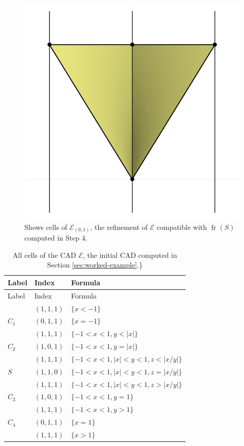 \documentclass[
]{book}
\theoremstyle{definition}
\theoremstyle{definition}
\theoremstyle{definition}
\theoremstyle{definition}
\theoremstyle{remark}
\begin{document}
\begin{figure}

{\centering \includegraphics[width=0.6\linewidth]{gnuplot/r3-refined} 

}

\caption{Shows cells of $\mathcal{E}_{(0,1)}$, the refinement of $\mathcal{E}$ compatible with ${\operatorname{fr} \left( S \right)}$ computed in Step 4.}\label{fig:final-cad}
\end{figure}

\begin{longtable}[]{@{}lll@{}}
\caption{\label{tab:cells-of-e} All cells of the CAD \(\mathcal{E}\), the initial CAD computed in Section \ref{sec:worked-example}.\}}\tabularnewline
\toprule
Label & Index & Formula\tabularnewline
\midrule
\endfirsthead
\toprule
Label & Index & Formula\tabularnewline
\midrule
\endhead
& \((1,1,1)\) & \(\{ x < -1 \}\)\tabularnewline
\(C_1\) & \((0,1,1)\) & \(\{ x = -1 \}\)\tabularnewline
& \((1,1,1)\) & \(\{ -1 < x < 1, y < \vert x \vert \}\)\tabularnewline
\(C_2\) & \((1,0,1)\) & \(\{ -1 < x < 1, y = \vert x \vert \}\)\tabularnewline
& \((1,1,1)\) & \(\{ -1 < x < 1, \vert x \vert < y < 1, z < \vert x/y \vert \}\)\tabularnewline
\(S\) & \((1,1,0)\) & \(\{ -1 < x < 1, \vert x \vert < y < 1, z = \vert x/y \vert \}\)\tabularnewline
& \((1,1,1)\) & \(\{ -1 < x < 1, \vert x \vert < y < 1, z > \vert x/y \vert \}\)\tabularnewline
\(C_3\) & \((1,0,1)\) & \(\{ -1 < x < 1, y = 1 \}\)\tabularnewline
& \((1,1,1)\) & \(\{ -1 < x < 1, y > 1 \}\)\tabularnewline
\(C_4\) & \((0,1,1)\) & \(\{ x = 1 \}\)\tabularnewline
& \((1,1,1)\) & \(\{ x > 1 \}\)\tabularnewline
\bottomrule
\end{longtable}
\end{document}
